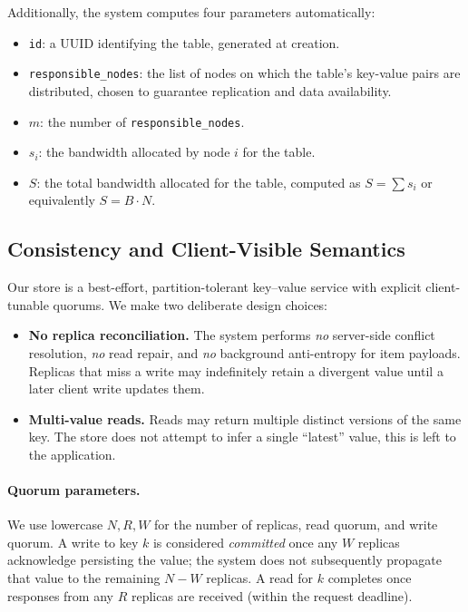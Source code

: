 Additionally, the system computes four parameters automatically:
\begin{itemize}
    \item \texttt{id}: a UUID identifying the table, generated at creation.
    \item \texttt{responsible\_nodes}: the list of nodes on which the table's
        key-value pairs are distributed, chosen to guarantee replication and
        data availability.
    \item $m$: the number of \texttt{responsible\_nodes}.
    \item $s_i$: the bandwidth allocated by node $i$ for the table.
    \item $S$: the total bandwidth allocated for the table, computed as $S =
        \sum s_i$ or equivalently $S = B \cdot N$.
\end{itemize}

\subsection{Consistency and Client-Visible Semantics}
\label{subsec:consistency}

Our store is a best-effort, partition-tolerant key–value service with explicit
client-tunable quorums. We make two deliberate design choices:

\begin{itemize}
    \item \textbf{No replica reconciliation.}
        The system performs \emph{no} server-side conflict resolution,
        \emph{no} read repair, and \emph{no} background anti-entropy for item
        payloads.
        Replicas that miss a write may indefinitely retain a divergent value
        until a later client write updates them.
    \item \textbf{Multi-value reads.}
        Reads may return multiple distinct versions of the same key.
        The store does not attempt to infer a single ``latest'' value, this is
        left to the application.
\end{itemize}

\paragraph{Quorum parameters.}
We use lowercase $N, R, W$ for the number of replicas, read quorum, and write
quorum.
A write to key $k$ is considered \emph{committed} once any $W$ replicas
acknowledge persisting the value; the system does not subsequently propagate
that value to the remaining $N - W$ replicas.
A read for $k$ completes once responses from any $R$ replicas are received
(within the request deadline).

